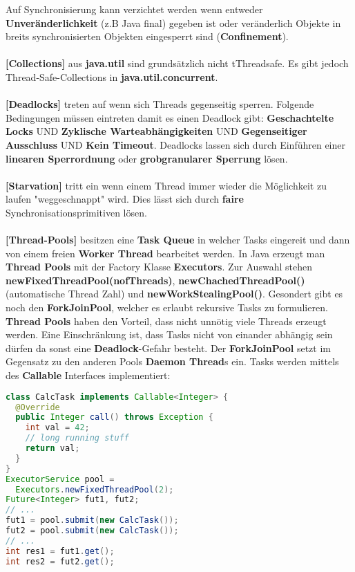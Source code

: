 \documentclass[8pt]{extarticle}
\let\oldtextbf\textbf
\renewcommand{\textbf}{\tiny\oldtextbf}
\begin{document}
\begin{multicols*}{5}
Auf Synchronisierung kann verzichtet werden wenn entweder \textbf{Unveränderlichkeit} (z.B Java final) gegeben ist oder veränderlich Objekte in breits synchronisierten Objekten eingesperrt sind (\textbf{Confinement}).\\\\
\textbf{[Collections]} aus \textbf{java.util} sind grundsätzlich nicht tThreadsafe. Es gibt jedoch Thread-Safe-Collections in \textbf{java.util.concurrent}.\\\\
\textbf{[Deadlocks]} treten auf wenn sich Threads gegenseitig sperren. Folgende Bedingungen müssen eintreten damit es einen Deadlock gibt: \textbf{Geschachtelte Locks} UND \textbf{Zyklische Warteabhängigkeiten} UND \textbf{Gegenseitiger Ausschluss} UND \textbf{Kein Timeout}. Deadlocks lassen sich durch Einführen einer \textbf{linearen Sperrordnung} oder \textbf{grobgranularer Sperrung} lösen.\\\\
\textbf{[Starvation]} tritt ein wenn einem Thread immer wieder die Möglichkeit zu laufen "weggeschnappt" wird. Dies lässt sich durch \textbf{faire} Synchronisationsprimitiven lösen.\\\\
\textbf{[Thread-Pools]} besitzen eine \textbf{Task Queue} in welcher Tasks eingereit und dann von einem freien \textbf{Worker Thread} bearbeitet werden. In Java erzeugt man \textbf{Thread Pools} mit der Factory Klasse \textbf{Executors}. Zur Auswahl stehen \textbf{newFixedThreadPool(nofThreads)}, \textbf{newChachedThreadPool()} (automatische Thread Zahl) und \textbf{newWorkStealingPool()}. Gesondert gibt es noch den \textbf{ForkJoinPool}, welcher es erlaubt rekursive Tasks zu formulieren. \textbf{Thread Pools} haben den Vorteil, dass nicht unnötig viele Threads erzeugt werden. Eine Einschränkung ist, dass Tasks nicht von einander abhängig sein dürfen da sonst eine \textbf{Deadlock}-Gefahr besteht. Der \textbf{ForkJoinPool} setzt im Gegensatz zu den anderen Pools \textbf{Daemon Thread}s ein. Tasks werden mittels des \textbf{Callable} Interfaces implementiert:
\begin{lstlisting}[language=java]
class CalcTask implements Callable<Integer> {
  @Override
  public Integer call() throws Exception {
    int val = 42;
    // long running stuff
    return val;
  }
}
ExecutorService pool =
  Executors.newFixedThreadPool(2);
Future<Integer> fut1, fut2;
// ...
fut1 = pool.submit(new CalcTask());
fut2 = pool.submit(new CalcTask());
// ...
int res1 = fut1.get();
int res2 = fut2.get();

\end{lstlisting}
\end{multicols*}
\end{document}
